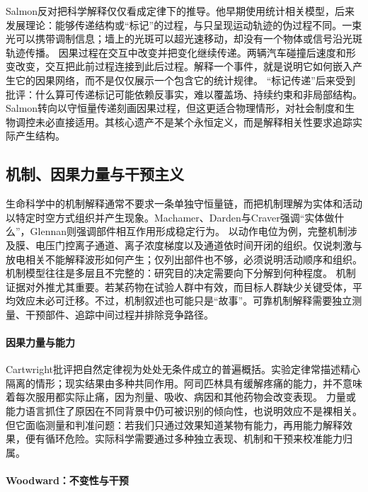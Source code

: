 Salmon反对把科学解释仅仅看成定律下的推导。他早期使用统计相关模型，后来发展理论：能够传递结构或“标记”的过程，与只呈现运动轨迹的伪过程不同\parencite{salmon1984}。一束光可以携带调制信息；墙上的光斑可以超光速移动，却没有一个物体或信号沿光斑轨迹传播。
因果过程在交互中改变并把变化继续传递。两辆汽车碰撞后速度和形变改变，交互把此前过程连接到此后过程。解释一个事件，就是说明它如何嵌入产生它的因果网络，而不是仅仅展示一个包含它的统计规律。
“标记传递”后来受到批评：什么算可传递标记可能依赖反事实，难以覆盖场、持续约束和非局部结构。Salmon转向以守恒量传递刻画因果过程，但这更适合物理情形，对社会制度和生物调控未必直接适用。其核心遗产不是某个永恒定义，而是解释相关性要求追踪实际产生结构。

\subsection{机制、因果力量与干预主义}

生命科学中的机制解释通常不要求一条单独守恒量链，而把机制理解为实体和活动以特定时空方式组织并产生现象。Machamer、Darden与Craver强调“实体做什么”，Glennan则强调部件相互作用形成稳定行为\parencite{mdc2000,glennan2017}。
以动作电位为例，完整机制涉及膜、电压门控离子通道、离子浓度梯度以及通道依时间开闭的组织。仅说刺激与放电相关不能解释波形如何产生；仅列出部件也不够，必须说明活动顺序和组织。机制模型往往是多层且不完整的：研究目的决定需要向下分解到何种程度。
机制证据对外推尤其重要。若某药物在试验人群中有效，而目标人群缺少关键受体，平均效应未必可迁移。不过，机制叙述也可能只是“故事”。可靠机制解释需要独立测量、干预部件、追踪中间过程并排除竞争路径。

\paragraph{因果力量与能力}

Cartwright批评把自然定律视为处处无条件成立的普遍概括。实验定律常描述精心隔离的情形；现实结果由多种共同作用\parencite{cartwright1989}。阿司匹林具有缓解疼痛的能力，并不意味着每次服用都实际止痛，因为剂量、吸收、病因和其他药物会改变表现。
力量或能力语言抓住了原因在不同背景中仍可被识别的倾向性，也说明效应不是裸相关。但它面临测量和判准问题：若我们只通过效果知道某物有能力，再用能力解释效果，便有循环危险。实际科学需要通过多种独立表现、机制和干预来校准能力归属。

\paragraph{Woodward：不变性与干预}

